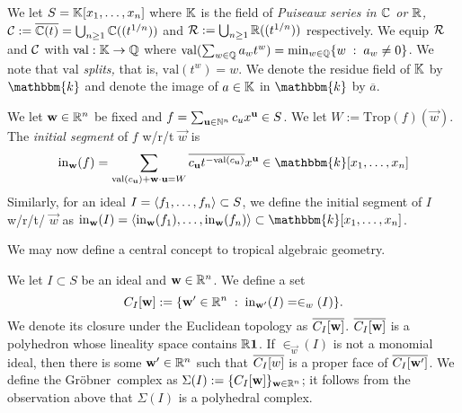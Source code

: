 \documentclass[12pt,letter]{article}
\newcommand{\trop}{\mathrm{Trop}}
\newcommand{\gro}{Gr\"obner~}
\newcommand{\val}{\mathrm{val}}
\newcommand{\res}[1]{\overline{#1}}
\newcommand{\kk}{\mathbbm{k}}
\newcommand{\ins}{\mathrm{in}}
\begin{document}
We let $S={\mathbb K}[x_1,\hdots,x_n]$ where ${\mathbb K}$ is the field of \emph{Puiseaux series in ${\mathbb C}$ or ${\mathbb R}$,} ${\mathcal C}:=\overline{{\mathbb C}(t)}=\bigcup_{n\geq 1}{\mathbb C}((t^{1/n}))$ and ${\mathcal R}:=\bigcup_{n\geq 1}{\mathbb R}((t^{1/n}))$ respectively. We equip ${\mathcal R}$ and ${\mathcal C}$ with $\val:\KK\to \QQ$ where $\val(\sum_{w\in \QQ}a_wt^w)=\min_{w\in \QQ}\{w\;:\;a_w\neq 0\}$. We note that $\val$ \emph{splits,} that is, $\val(t^w)=w$. We denote the residue field of ${\mathbb K}$ by $\kk$ and denote the image of $a\in {\mathbb K}$ in $\kk$ by $\res{a}$.
\begin{definition}
	We let $\mathbf{w}\in {\mathbb R}^{n}$ be fixed and $f=\sum_{\mathbf{u}\in {\mathbb N}^n}c_ux^\mathbf{u}\in S$. We let $W:=\trop(f)(\vec{w})$. The \emph{initial segment} of $f$ w/r/t $\vec{w}$ is $$\ins_{\vec{w}}(f)=\sum_{\val({c_\vec{u}})+\vec{w}\cdot\vec{u}=W}\res{c_\vec{u}t^{-\val({c_\vec{u}})}}x^\vec{u}\in \kk[x_1,\hdots,x_n]$$                                              Similarly, for an ideal $I=\langle f_1,\hdots,f_n \rangle\subset S$, we define the initial segment of $I$ w/r/t/ $\vec{w}$  as $\ins_\vec{w}(I)=\idl{\ins_\vec{w}(f_1),\hdots,\ins_\vec{w}(f_n)}\subset \kk[x_1,\hdots,x_n]$.                         
\end{definition}
We may now define a central concept to tropical algebraic geometry.
\begin{definition}
	We let $I\subset S$ be an ideal and $\mathbf{w}\in {\mathbb R}^n$. We define a set $$C_I[\vec{w}]:=\{\vec{w}'\in \RR^n\;:\;\ins_{\vec{w}'}(I)=\in_w(I)\}.$$ We denote its closure under the Euclidean topology as $\overline{C_I[\mathbf{w}]}$. $\overline{C_I[\mathbf{w}]}$ is a polyhedron whose lineality space contains ${\mathbb R}\mathbf{1}$. If $\in_\vec{w}(I)$ is not a monomial ideal, then there is some $\mathbf{w}'\in {\mathbb R}^n$ such that $\overline{C_I[w]} $ is a proper face of $\overline{C_I[\mathbf{w'}]}$. We define the \gro complex as $\Sigma(I):=\{C_{I}[\mathbf{w}]\}_{\mathbf{w}\in {\mathbb R}^n}$; it follows from the observation above that $\Sigma(I)$ is a polyhedral complex.
\end{definition}
\begin{example}
\ddi{\gro example for PL(2,6)}
\end{example}
\end{document}

